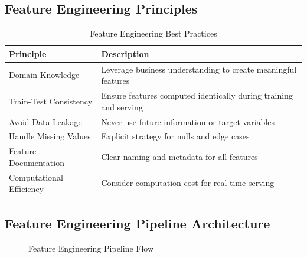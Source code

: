 \subsection{Feature Engineering Principles}

\begin{table}[h]
\centering
\caption{Feature Engineering Best Practices}
\label{tab:feature_engineering_principles}
\begin{tabular}{|l|p{10cm}|}
\hline
\textbf{Principle} & \textbf{Description} \\
\hline
Domain Knowledge & Leverage business understanding to create meaningful features \\
Train-Test Consistency & Ensure features computed identically during training and serving \\
Avoid Data Leakage & Never use future information or target variables \\
Handle Missing Values & Explicit strategy for nulls and edge cases \\
Feature Documentation & Clear naming and metadata for all features \\
Computational Efficiency & Consider computation cost for real-time serving \\
\hline
\end{tabular}
\end{table}

\subsection{Feature Engineering Pipeline Architecture}

\begin{figure}[h]
\centering
{}
\caption{Feature Engineering Pipeline Flow}
\label{fig:feature_pipeline}
\end{figure}

